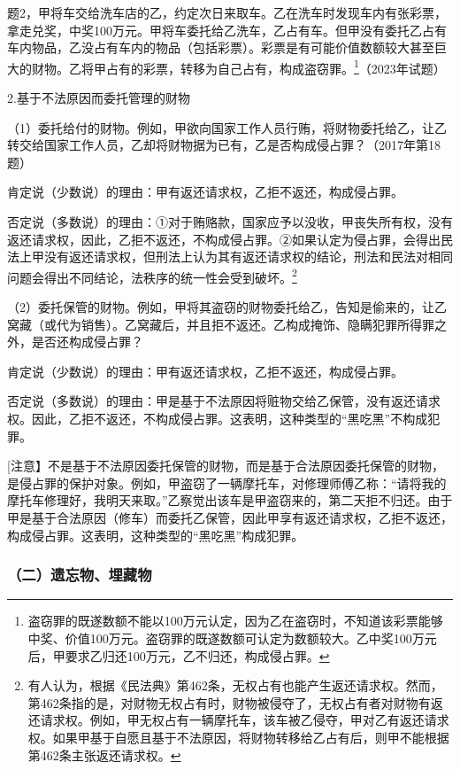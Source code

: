 题2，甲将车交给洗车店的乙，约定次日来取车。乙在洗车时发现车内有张彩票，拿走兑奖，中奖100万元。甲将车委托给乙洗车，乙占有车。但甲没有委托乙占有车内物品，乙没占有车内的物品（包括彩票）。彩票是有可能价值数额较大甚至巨大的财物。乙将甲占有的彩票，转移为自己占有，构成盗窃罪。\footnote{盗窃罪的既遂数额不能以100万元认定，因为乙在盗窃时，不知道该彩票能够中奖、价值100万元。盗窃罪的既遂数额可认定为数额较大。乙中奖100万元后，甲要求乙归还100万元，乙不归还，构成侵占罪。}（2023年试题）

2.基于不法原因而委托管理的财物

（1）委托给付的财物。例如，甲欲向国家工作人员行贿，将财物委托给乙，让乙转交给国家工作人员，乙却将财物据为已有，乙是否构成侵占罪？（2017年第18题）

肯定说（少数说）的理由：甲有返还请求权，乙拒不返还，构成侵占罪。

否定说（多数说）的理由：①对于贿赂款，国家应予以没收，甲丧失所有权，没有返还请求权，因此，乙拒不返还，不构成侵占罪。②如果认定为侵占罪，会得出民法上甲没有返还请求权，但刑法上认为其有返还请求权的结论，刑法和民法对相同问题会得出不同结论，法秩序的统一性会受到破坏。\footnote{有人认为，根据《民法典》第462条，无权占有也能产生返还请求权。然而，第462条指的是，对财物无权占有时，财物被侵夺了，无权占有者对财物有返还请求权。例如，甲无权占有一辆摩托车，该车被乙侵夺，甲对乙有返还请求权。如果甲基于自愿且基于不法原因，将财物转移给乙占有后，则甲不能根据第462条主张返还请求权。}

（2）委托保管的财物。例如，甲将其盗窃的财物委托给乙，告知是偷来的，让乙窝藏（或代为销售）。乙窝藏后，并且拒不返还。乙构成掩饰、隐瞒犯罪所得罪之外，是否还构成侵占罪？

肯定说（少数说）的理由：甲有返还请求权，乙拒不返还，构成侵占罪。

否定说（多数说）的理由：甲是基于不法原因将赃物交给乙保管，没有返还请求权。因此，乙拒不返还，不构成侵占罪。这表明，这种类型的“黑吃黑”不构成犯罪。

[注意】不是基于不法原因委托保管的财物，而是基于合法原因委托保管的财物，是侵占罪的保护对象。例如，甲盗窃了一辆摩托车，对修理师傅乙称：“请将我的摩托车修理好，我明天来取。”乙察觉出该车是甲盗窃来的，第二天拒不归还。由于甲是基于合法原因（修车）而委托乙保管，因此甲享有返还请求权，乙拒不返还，构成侵占罪。这表明，这种类型的“黑吃黑”构成犯罪。

\subsubsection*{（二）遗忘物、埋藏物}

